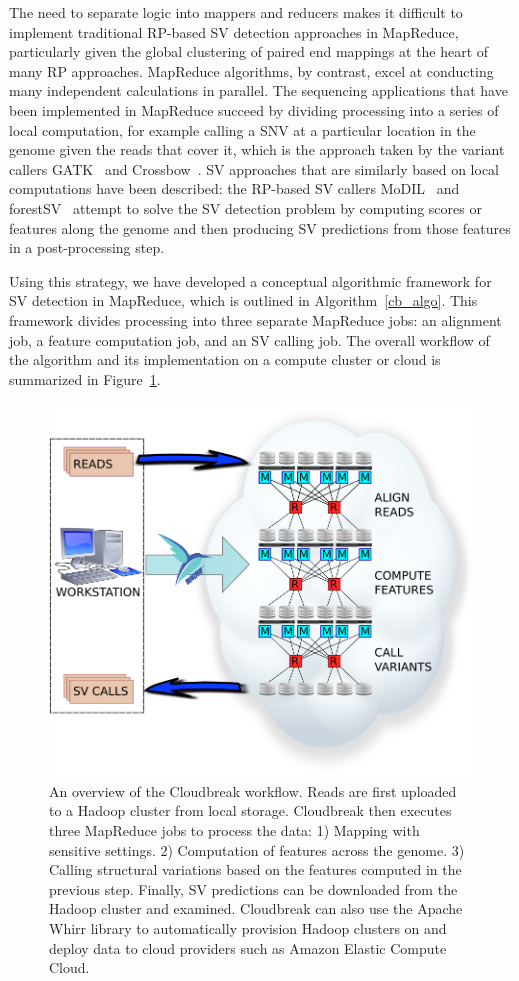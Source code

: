 \documentclass [11pt] {report}
\begin{document}
The need to separate logic into mappers and reducers makes it difficult to implement traditional RP-based SV detection approaches in MapReduce, particularly given the global clustering of paired end mappings at the heart of many RP approaches. MapReduce algorithms, by contrast, excel at conducting many independent calculations in parallel. The sequencing applications that have been implemented in MapReduce succeed by dividing processing into a series of local computation, for example calling a SNV at a particular location in the genome given the reads that cover it, which is the approach taken by the variant callers GATK~\cite{McKenna:2010p1051} and Crossbow~\cite{Langmead:2009p1225}. SV approaches that are similarly based on local computations have been described: the RP-based SV callers MoDIL~\cite{Lee:2009da} and forestSV~\cite{Michaelson:2012fj} attempt to solve the SV detection problem by computing scores or features along the genome and then producing SV predictions from those features in a post-processing step. 

Using this strategy, we have developed a conceptual algorithmic framework for SV detection in MapReduce, which is outlined in Algorithm~\ref{cb_algo}. This framework divides processing into three separate MapReduce jobs: an alignment job, a feature computation job, and an SV calling job. The overall workflow of the algorithm and its implementation on a compute cluster or cloud is summarized in Figure~\ref{cloudbreak_workflow}.

\begin{figure}
\centering
\includegraphics[width=.8\textwidth]{figures/workflow_with_whirr.png}
\caption{An overview of the Cloudbreak workflow. Reads are first uploaded to a Hadoop cluster from local storage. Cloudbreak then executes three MapReduce jobs to process the data: 1) Mapping with sensitive settings. 2) Computation of features across the genome. 3) Calling structural variations based on the features computed in the previous step. Finally, SV predictions can be downloaded from the Hadoop cluster and examined. Cloudbreak can also use the Apache Whirr library to automatically provision Hadoop clusters on and deploy data to cloud providers such as Amazon Elastic Compute Cloud.}
\label{cloudbreak_workflow}
\end{figure}
\end{document}

